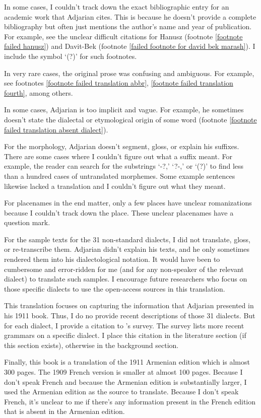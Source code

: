 In some cases, I couldn't track down the exact bibliographic entry for an academic work that Adjarian cites. This is because he doesn't provide a complete bibliography but often just mentions the author's name and year of publication. For example, see the unclear   difficult citations   for Hanusz (footnote \ref{footnote failed hanusz}) and Davit-Bek (footnote \ref{failed footnote for david bek marash}). I include the symbol `(?)' for such footnotes.

In very rare cases, the original prose was confusing and ambiguous. For example, see footnotes \ref{footnote failed translation abbr}, \ref{footnote failed translation fourth},  among others.

In some cases, Adjarian is too implicit and vague. For example, he sometimes doesn't state the dialectal or etymological origin of  some word (footnote  \ref{footnote failed translation absent dialect}). 



For the morphology,        Adjarian doesn't segment, gloss, or explain his suffixes. There are some cases where I couldn't figure out what a suffix meant. For    example, the reader can search for the substrings `-?,'  `?-,' or `(?)' to find less than a hundred cases of untranslated morphemes. Some example sentences likewise lacked a translation and I couldn't figure out what they meant. 

For placenames in the end matter, only a few places have unclear romanizations because I couldn't track down the place. These unclear placenames have a question mark. 

For the sample texts for the 31 non-standard dialects, I did not translate, gloss, or re-transcribe them. Adjarian didn't   explain his texts, and he only sometimes rendered them into his dialectological notation. It would have been to cumbersome and error-ridden for me (and for any non-speaker of the relevant dialect) to translate such samples. I encourage future researchers who focus on those specific dialects to use the open-access sources in this translation. 

This translation focuses on capturing the information that Adjarian presented in his 1911 book. Thus, I do no provide recent descriptions of those 31 dialects. But for each dialect, I provide a citation to \citet{Martirosyan-2019-ArmenianDialectsBigVersionRussianJournal}'s survey. The survey lists more recent grammars on a specific dialect. I place this citation  in the literature section (if this section exists), otherwise in the background section. 

Finally, this book is a translation of the 1911 Armenian edition which is almost 300 pages. The 1909 French version is smaller at almost 100 pages. Because I don't speak French and because the Armenian edition is substantially larger, I used the Armenian edition as the source to translate. Because I don't speak French, it's unclear to me if there's any information present in the French edition that is absent in the Armenian edition. 

